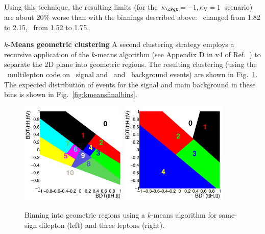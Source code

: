Using this technique, the resulting limits (for the $\Ct=-1, \CV=1$ scenario) are about 20\% worse than with the binnings described above: \mumu\ changed from 1.82 to 2.15, \threel\ from 1.52 to 1.75.

\textbf{$k$-Means geometric clustering}
A second clustering strategy employs a recursive application of the $k$-means algorithm (see Appendix D in v4 of Ref.~\cite{CMS_AN_2017-029}) to separate the 2D plane into geometric regions.
The resulting clustering (using the \ttH\ multilepton code on \tHq\ signal and \ttbar\ and \ttV\ background events) are shown in Fig.~\ref{fig:kmeansbinning}.
The expected distribution of events for the signal and main background in these bins is shown in Fig.~\ref{fig:kmeansfinalbins}.
\begin{figure} [!h]
 \centering
 \includegraphics[width=0.45\textwidth]{figures/binning/voronoi_2l_trial0.png}
 \includegraphics[width=0.45\textwidth]{figures/binning/voronoi_3l_trial0.png}
\caption{Binning into geometric regions using a $k$-means algorithm for same-sign dilepton (left) and three leptons (right).}
\label{fig:kmeansbinning}
\end{figure}

